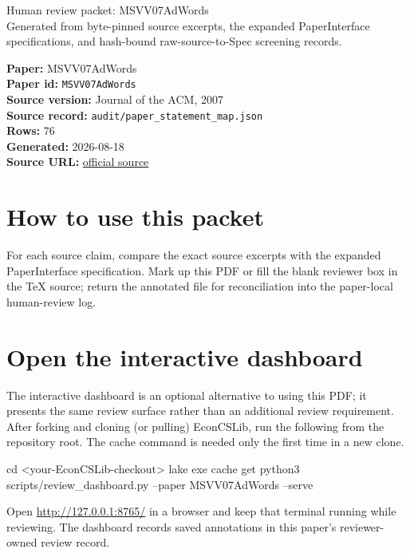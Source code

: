 \documentclass[10pt]{article}
\begin{document}
\fontsize{9}{10}\selectfont

\begin{center}
{\LARGE Human review packet: MSVV07AdWords}\\[0.35em]
\small Generated from byte-pinned source excerpts, the expanded PaperInterface
specifications, and hash-bound raw-source-to-Spec screening records.
\end{center}

\noindent\textbf{Paper:} MSVV07AdWords\\
\textbf{Paper id:} \texttt{MSVV07AdWords}\\
\textbf{Source version:} Journal of the ACM, 2007\\
\textbf{Source record:} \texttt{audit/paper\_statement\_map.json}\\
\textbf{Rows:} 76\\
\textbf{Generated:} 2026-08-18\\
\textbf{Source URL:} \href{https://people.eecs.berkeley.edu/~vazirani/pubs/adwords.pdf}{official source}

\noindent{}\par



\section*{How to use this packet}
For each source claim, compare the exact source excerpts with the expanded
PaperInterface specification. Mark up this PDF or fill the blank reviewer box in the TeX source;
return the annotated file for reconciliation into the paper-local human-review
log.

\section*{Open the interactive dashboard}
The interactive dashboard is an optional alternative to using this PDF; it
presents the same review surface rather than an additional review requirement.
After forking and cloning (or pulling) EconCSLib, run the following from the
repository root. The cache command is needed only the first time in a new clone.
\begin{ReviewVerbatim}
cd <your-EconCSLib-checkout>
lake exe cache get
python3 scripts/review_dashboard.py --paper MSVV07AdWords --serve
\end{ReviewVerbatim}
Open \url{http://127.0.0.1:8765/} in a browser and keep that terminal running
while reviewing. The dashboard records saved annotations in this paper's
reviewer-owned review record.
\end{document}
